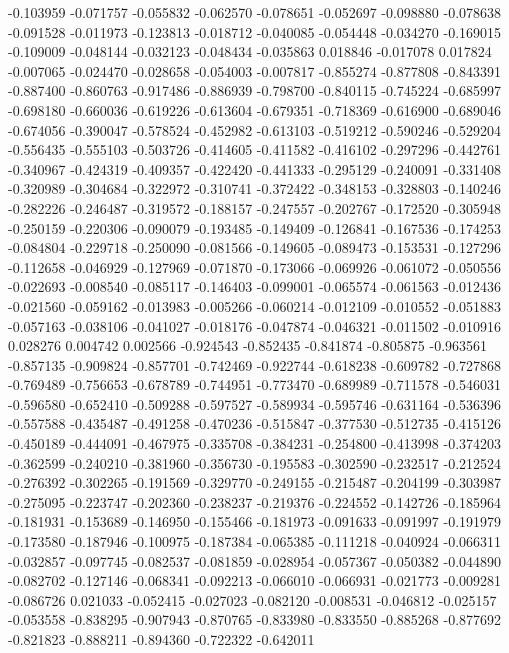 -0.103959
-0.071757
-0.055832
-0.062570
-0.078651
-0.052697
-0.098880
-0.078638
-0.091528
-0.011973
-0.123813
-0.018712
-0.040085
-0.054448
-0.034270
-0.169015
-0.109009
-0.048144
-0.032123
-0.048434
-0.035863
0.018846
-0.017078
0.017824
-0.007065
-0.024470
-0.028658
-0.054003
-0.007817
-0.855274
-0.877808
-0.843391
-0.887400
-0.860763
-0.917486
-0.886939
-0.798700
-0.840115
-0.745224
-0.685997
-0.698180
-0.660036
-0.619226
-0.613604
-0.679351
-0.718369
-0.616900
-0.689046
-0.674056
-0.390047
-0.578524
-0.452982
-0.613103
-0.519212
-0.590246
-0.529204
-0.556435
-0.555103
-0.503726
-0.414605
-0.411582
-0.416102
-0.297296
-0.442761
-0.340967
-0.424319
-0.409357
-0.422420
-0.441333
-0.295129
-0.240091
-0.331408
-0.320989
-0.304684
-0.322972
-0.310741
-0.372422
-0.348153
-0.328803
-0.140246
-0.282226
-0.246487
-0.319572
-0.188157
-0.247557
-0.202767
-0.172520
-0.305948
-0.250159
-0.220306
-0.090079
-0.193485
-0.149409
-0.126841
-0.167536
-0.174253
-0.084804
-0.229718
-0.250090
-0.081566
-0.149605
-0.089473
-0.153531
-0.127296
-0.112658
-0.046929
-0.127969
-0.071870
-0.173066
-0.069926
-0.061072
-0.050556
-0.022693
-0.008540
-0.085117
-0.146403
-0.099001
-0.065574
-0.061563
-0.012436
-0.021560
-0.059162
-0.013983
-0.005266
-0.060214
-0.012109
-0.010552
-0.051883
-0.057163
-0.038106
-0.041027
-0.018176
-0.047874
-0.046321
-0.011502
-0.010916
0.028276
0.004742
0.002566
-0.924543
-0.852435
-0.841874
-0.805875
-0.963561
-0.857135
-0.909824
-0.857701
-0.742469
-0.922744
-0.618238
-0.609782
-0.727868
-0.769489
-0.756653
-0.678789
-0.744951
-0.773470
-0.689989
-0.711578
-0.546031
-0.596580
-0.652410
-0.509288
-0.597527
-0.589934
-0.595746
-0.631164
-0.536396
-0.557588
-0.435487
-0.491258
-0.470236
-0.515847
-0.377530
-0.512735
-0.415126
-0.450189
-0.444091
-0.467975
-0.335708
-0.384231
-0.254800
-0.413998
-0.374203
-0.362599
-0.240210
-0.381960
-0.356730
-0.195583
-0.302590
-0.232517
-0.212524
-0.276392
-0.302265
-0.191569
-0.329770
-0.249155
-0.215487
-0.204199
-0.303987
-0.275095
-0.223747
-0.202360
-0.238237
-0.219376
-0.224552
-0.142726
-0.185964
-0.181931
-0.153689
-0.146950
-0.155466
-0.181973
-0.091633
-0.091997
-0.191979
-0.173580
-0.187946
-0.100975
-0.187384
-0.065385
-0.111218
-0.040924
-0.066311
-0.032857
-0.097745
-0.082537
-0.081859
-0.028954
-0.057367
-0.050382
-0.044890
-0.082702
-0.127146
-0.068341
-0.092213
-0.066010
-0.066931
-0.021773
-0.009281
-0.086726
0.021033
-0.052415
-0.027023
-0.082120
-0.008531
-0.046812
-0.025157
-0.053558
-0.838295
-0.907943
-0.870765
-0.833980
-0.833550
-0.885268
-0.877692
-0.821823
-0.888211
-0.894360
-0.722322
-0.642011
